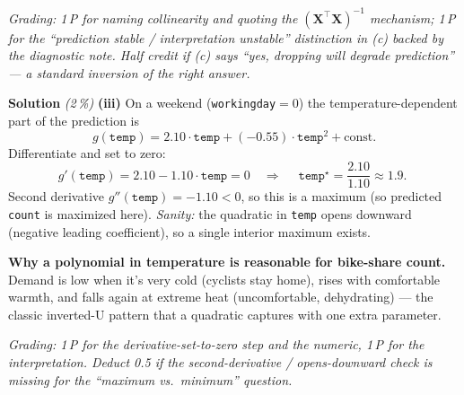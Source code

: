 \documentclass[11pt,a4paper]{article}
\newcommand{\subpoints}[1]{\textit{(#1\,\%)}}
\newcommand{\sol}{\noindent\textbf{Solution}}
\begin{document}
\noindent\emph{Grading: 1\,P for naming collinearity and quoting the $(\mathbf X^\top\mathbf X)^{-1}$
mechanism; 1\,P for the ``prediction stable / interpretation unstable'' distinction in (c) backed
by the diagnostic note. Half credit if (c) says ``yes, dropping will degrade prediction'' --- a
standard inversion of the right answer.}

\medskip
\sol{} \subpoints{2} \textbf{(iii)} On a weekend (\texttt{workingday}$=0$) the temperature-dependent
part of the prediction is
$$g(\texttt{temp}) = 2.10\cdot\texttt{temp} + (-0.55)\cdot\texttt{temp}^2 + \text{const}.$$
Differentiate and set to zero:
$$g'(\texttt{temp}) = 2.10 - 1.10\cdot\texttt{temp} = 0 \quad\Longrightarrow\quad
   \boxed{\;\texttt{temp}^\star = \frac{2.10}{1.10} \approx 1.9.\;}$$
Second derivative $g''(\texttt{temp}) = -1.10 < 0$, so this is a maximum (so predicted \texttt{count}
is maximized here). \emph{Sanity:} the quadratic in \texttt{temp} opens downward (negative leading
coefficient), so a single interior maximum exists.

\textbf{Why a polynomial in temperature is reasonable for bike-share count.} Demand is low when
it's very cold (cyclists stay home), rises with comfortable warmth, and falls again at extreme heat
(uncomfortable, dehydrating) --- the classic inverted-U pattern that a quadratic captures with one
extra parameter.

\noindent\emph{Grading: 1\,P for the derivative-set-to-zero step and the numeric, 1\,P for the
interpretation. Deduct 0.5 if the second-derivative / opens-downward check is missing for the
``maximum vs.\ minimum'' question.}
\end{document}
